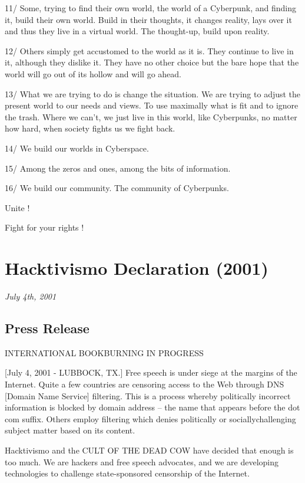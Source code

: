 \documentclass[letterpaper,12pt,english]{sphinxmanual}
\begin{document}
11/ Some, trying to find their own world, the world of a Cyberpunk, and finding it, build their own world. Build in their thoughts, it changes reality, lays over it and thus they live in a virtual world. The thought-up, build upon reality.

12/ Others simply get accustomed to the world as it is. They continue to live in it, although they dislike it. They have no other choice but the bare hope that the world will go out of its hollow and will go ahead.

13/ What we are trying to do is change the situation. We are trying to adjust the present world to our needs and views. To use maximally what is fit and to ignore the trash. Where we can't, we just live in this world, like Cyberpunks, no matter how hard, when society fights us we fight back.

14/ We build our worlds in Cyberspace.

15/ Among the zeros and ones, among the bits of information.

16/ We build our community. The community of Cyberpunks.

Unite !

Fight for your rights !


\chapter{Hacktivismo Declaration (2001)}
\label{2001::doc}\label{2001:hacktivismo-declaration-2001}\label{2001:index-0}
\emph{July 4th, 2001}


\section{Press Release}
\label{2001:press-release}
INTERNATIONAL BOOKBURNING IN PROGRESS

{[}July 4, 2001 - LUBBOCK, TX.{]} Free speech is under siege at the margins of the Internet. Quite a few countries are censoring access to the Web through DNS {[}Domain Name Service{]} filtering. This is a process whereby politically incorrect information is blocked by domain address -- the name that appears before the dot com suffix. Others employ filtering which denies politically or sociallychallenging subject matter based on its content.

Hacktivismo and the CULT OF THE DEAD COW have decided that enough is too much. We are hackers and free speech advocates, and we are developing technologies to challenge state-sponsored censorship of the Internet.
\end{document}
